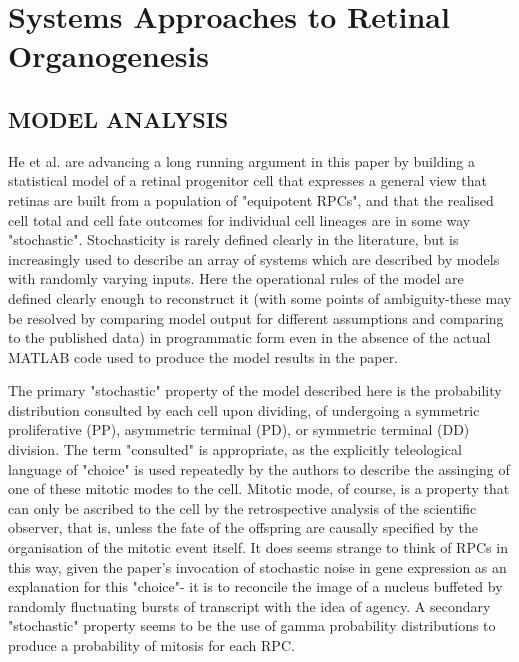 \documentclass{ut-thesis}
\begin{document}
\chapter{Systems Approaches to Retinal Organogenesis}

\section{MODEL ANALYSIS}

He et al. are advancing a long running argument in this paper by building a statistical model of a retinal progenitor cell that expresses a general view that retinas are built from a population of "equipotent RPCs", and that the realised cell total and cell fate outcomes for individual cell lineages are in some way "stochastic". Stochasticity is rarely defined clearly in the literature, but is increasingly used to describe an array of systems which are described by models with randomly varying inputs. Here the operational rules of the model are defined clearly enough to reconstruct it (with some points of ambiguity-these may be resolved by comparing model output for different assumptions and comparing to the published data) in programmatic form even in the absence of the actual MATLAB code used to produce the model results in the paper.

The primary "stochastic" property of the model described here is the probability distribution consulted by each cell upon dividing, of undergoing a symmetric proliferative (PP), asymmetric terminal (PD), or symmetric terminal (DD) division. The term "consulted" is appropriate, as the explicitly teleological language of "choice" is used repeatedly by the authors to describe the assinging of one of these mitotic modes to the cell. Mitotic mode, of course, is a property that can only be ascribed to the cell by the retrospective analysis of the scientific observer, that is, unless the fate of the offspring are causally specified by the organisation of the mitotic event itself. It does seems strange to think of RPCs in this way, given the paper's invocation of stochastic noise in gene expression as an explanation for this "choice"- it is to reconcile the image of a nucleus buffeted by randomly fluctuating bursts of transcript with the idea of agency. A secondary "stochastic" property seems to be the use of gamma probability distributions to produce a probability of mitosis for each RPC.
\end{document}
